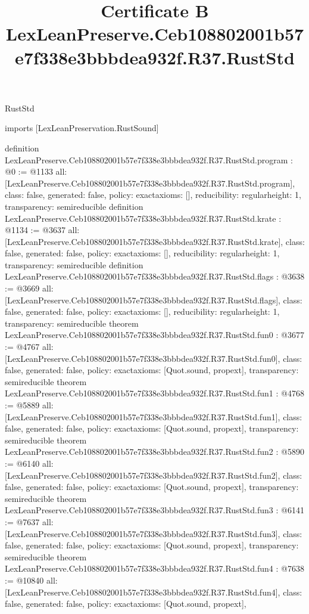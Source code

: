 \begin{lexlean}{RustStd}
\title{Certificate B LexLeanPreserve.Ceb108802001b57e7f338e3bbbdea932f.R37.RustStd}
\begin{coremodule}
imports [LexLeanPreservation.RustSound]

definition LexLeanPreserve.Ceb108802001b57e7f338e3bbbdea932f.R37.RustStd.program : @0 := @1133 {
  all: [LexLeanPreserve.Ceb108802001b57e7f338e3bbbdea932f.R37.RustStd.program],
  class: false,
  generated: false,
  policy: exact{axioms: []},
  reducibility: regular{height: 1},
  transparency: semireducible
}
definition LexLeanPreserve.Ceb108802001b57e7f338e3bbbdea932f.R37.RustStd.krate : @1134 := @3637 {
  all: [LexLeanPreserve.Ceb108802001b57e7f338e3bbbdea932f.R37.RustStd.krate],
  class: false,
  generated: false,
  policy: exact{axioms: []},
  reducibility: regular{height: 1},
  transparency: semireducible
}
definition LexLeanPreserve.Ceb108802001b57e7f338e3bbbdea932f.R37.RustStd.flags : @3638 := @3669 {
  all: [LexLeanPreserve.Ceb108802001b57e7f338e3bbbdea932f.R37.RustStd.flags],
  class: false,
  generated: false,
  policy: exact{axioms: []},
  reducibility: regular{height: 1},
  transparency: semireducible
}
theorem LexLeanPreserve.Ceb108802001b57e7f338e3bbbdea932f.R37.RustStd.fun0 : @3677 := @4767 {
  all: [LexLeanPreserve.Ceb108802001b57e7f338e3bbbdea932f.R37.RustStd.fun0],
  class: false,
  generated: false,
  policy: exact{axioms: [Quot.sound, propext]},
  transparency: semireducible
}
theorem LexLeanPreserve.Ceb108802001b57e7f338e3bbbdea932f.R37.RustStd.fun1 : @4768 := @5889 {
  all: [LexLeanPreserve.Ceb108802001b57e7f338e3bbbdea932f.R37.RustStd.fun1],
  class: false,
  generated: false,
  policy: exact{axioms: [Quot.sound, propext]},
  transparency: semireducible
}
theorem LexLeanPreserve.Ceb108802001b57e7f338e3bbbdea932f.R37.RustStd.fun2 : @5890 := @6140 {
  all: [LexLeanPreserve.Ceb108802001b57e7f338e3bbbdea932f.R37.RustStd.fun2],
  class: false,
  generated: false,
  policy: exact{axioms: [Quot.sound, propext]},
  transparency: semireducible
}
theorem LexLeanPreserve.Ceb108802001b57e7f338e3bbbdea932f.R37.RustStd.fun3 : @6141 := @7637 {
  all: [LexLeanPreserve.Ceb108802001b57e7f338e3bbbdea932f.R37.RustStd.fun3],
  class: false,
  generated: false,
  policy: exact{axioms: [Quot.sound, propext]},
  transparency: semireducible
}
theorem LexLeanPreserve.Ceb108802001b57e7f338e3bbbdea932f.R37.RustStd.fun4 : @7638 := @10840 {
  all: [LexLeanPreserve.Ceb108802001b57e7f338e3bbbdea932f.R37.RustStd.fun4],
  class: false,
  generated: false,
  policy: exact{axioms: [Quot.sound, propext]},
}
\end{coremodule}
\end{lexlean}
